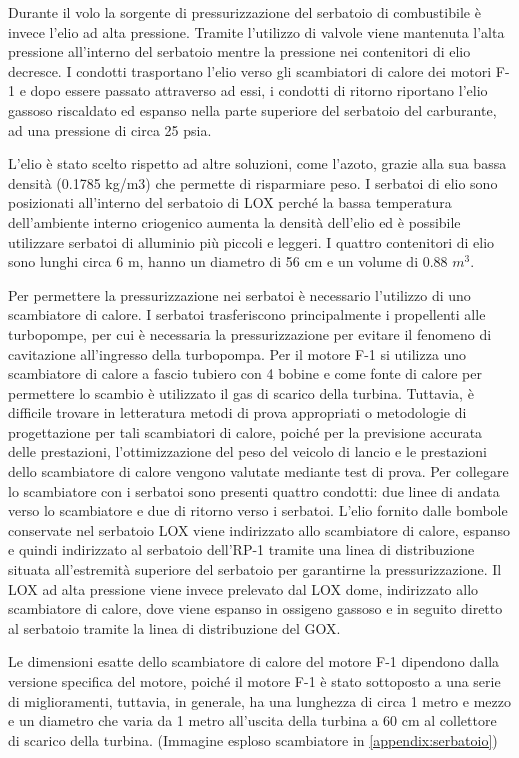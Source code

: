 Durante il volo la sorgente di pressurizzazione del serbatoio di combustibile è invece l’elio ad alta pressione. Tramite l’utilizzo di valvole viene mantenuta l’alta pressione all’interno del serbatoio mentre la pressione nei contenitori di elio decresce. 
I condotti trasportano l’elio verso gli scambiatori di calore dei motori F-1 e dopo essere passato attraverso ad essi, i condotti di ritorno riportano l’elio gassoso riscaldato ed espanso nella parte superiore del serbatoio del carburante, ad una pressione di circa 25 psia.

L’elio è stato scelto rispetto ad altre soluzioni, come l’azoto, grazie alla sua bassa densità (0.1785 kg/m3) che permette di risparmiare peso.
I serbatoi di elio sono posizionati all’interno del serbatoio di LOX perché la bassa temperatura dell’ambiente interno criogenico aumenta la densità dell’elio ed è possibile utilizzare serbatoi di alluminio più piccoli e leggeri.
I quattro contenitori di elio sono lunghi circa 6 m, hanno un diametro di 56 cm e un volume di 0.88 $m^3$.

Per permettere la pressurizzazione nei serbatoi è necessario l’utilizzo di uno scambiatore di calore.
I serbatoi trasferiscono principalmente i propellenti alle turbopompe, per cui è necessaria la pressurizzazione per evitare il fenomeno di cavitazione all'ingresso della turbopompa. 
Per il motore F-1 si utilizza uno scambiatore di calore a fascio tubiero con 4 bobine e come fonte di calore per permettere lo scambio è utilizzato il gas di scarico della turbina.
Tuttavia, è difficile trovare in letteratura metodi di prova appropriati o metodologie di progettazione per tali scambiatori di calore, poiché per la previsione accurata delle prestazioni, l'ottimizzazione del peso del veicolo di lancio e le prestazioni dello scambiatore di calore vengono valutate mediante test di prova. 
Per collegare lo scambiatore con i serbatoi sono presenti quattro condotti: due linee di andata verso lo scambiatore e due di ritorno verso i serbatoi.
L'elio fornito dalle bombole conservate nel serbatoio LOX viene indirizzato allo scambiatore di calore, espanso e quindi indirizzato al serbatoio dell’RP-1 tramite una linea di distribuzione situata all'estremità superiore del serbatoio per garantirne la pressurizzazione. 
Il LOX ad alta pressione viene invece prelevato dal LOX dome, indirizzato allo scambiatore di calore, dove viene espanso in ossigeno gassoso e in seguito diretto al serbatoio tramite la linea di distribuzione del GOX.

Le dimensioni esatte dello scambiatore di calore del motore F-1 dipendono dalla versione specifica del motore, poiché il motore F-1 è stato sottoposto a una serie di miglioramenti, tuttavia, in generale, ha una lunghezza di circa 1 metro e mezzo e un diametro che varia da 1 metro all'uscita della turbina a 60 cm al collettore di scarico della turbina. (Immagine esploso scambiatore in \autoref{appendix:serbatoio}) 


